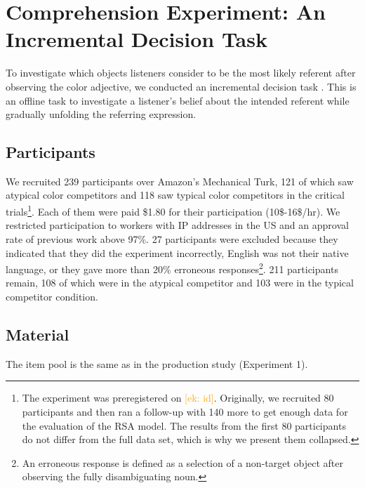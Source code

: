 \documentclass[10pt,letterpaper]{article}
\newcommand{\ek}[1]{\textcolor{Orange}{[ek: #1]}}
\begin{document}
\section{Comprehension Experiment: An Incremental Decision Task}
To investigate which objects listeners consider to be the most likely referent after observing the color adjective, we conducted an incremental decision task \cite{Qing:2018}. This is an offline task to investigate a listener's belief about the intended referent while gradually unfolding the referring expression.


\subsection{Participants}
We recruited 239 participants over Amazon's Mechanical Turk, 121 of which saw atypical color competitors and 118 saw typical color competitors in the critical trials\footnote{The experiment was preregistered on \ek{id}. Originally, we recruited 80 participants and then ran a follow-up with 140 more to get enough data for the evaluation of the RSA model. The results from the first 80 participants do not differ from the full data set, which is why we present them collapsed.}. Each of them were paid \$1.80 for their participation (10\$-16\$/hr). We restricted participation to workers with IP addresses in the US and an approval rate of previous work above 97\%. 
27 participants were excluded because they indicated that they did the experiment incorrectly, English was not their native language, or they gave more than 20\% erroneous responses\footnote{An erroneous response is defined as a selection of a non-target object after observing the fully disambiguating noun.}. 211 participants remain, 108 of which were in the atypical competitor and 103 were in the typical competitor condition. 



\subsection{Material}
The item pool is the same as in the production study (Experiment 1).
\end{document}
